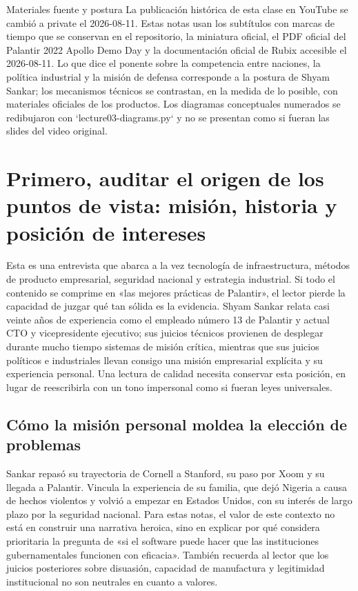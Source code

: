 \documentclass[a4paper]{article}
\begin{document}
\makecscover

\begin{warningbox}{Materiales fuente y postura}
La publicación histórica de esta clase en YouTube se cambió a private el 2026-08-11. Estas notas usan los subtítulos con marcas de tiempo que se conservan en el repositorio, la miniatura oficial, el PDF oficial del Palantir 2022 Apollo Demo Day y la documentación oficial de Rubix accesible el 2026-08-11. Lo que dice el ponente sobre la competencia entre naciones, la política industrial y la misión de defensa corresponde a la postura de Shyam Sankar; los mecanismos técnicos se contrastan, en la medida de lo posible, con materiales oficiales de los productos. Los diagramas conceptuales numerados se redibujaron con `lecture03-diagrams.py` y no se presentan como si fueran las slides del video original.
\end{warningbox}

\section{Primero, auditar el origen de los puntos de vista: misión, historia y posición de intereses}

Esta es una entrevista que abarca a la vez tecnología de infraestructura, métodos de producto empresarial, seguridad nacional y estrategia industrial. Si todo el contenido se comprime en «las mejores prácticas de Palantir», el lector pierde la capacidad de juzgar qué tan sólida es la evidencia. Shyam Sankar relata casi veinte años de experiencia como el empleado número 13 de Palantir y actual CTO y vicepresidente ejecutivo; sus juicios técnicos provienen de desplegar durante mucho tiempo sistemas de misión crítica, mientras que sus juicios políticos e industriales llevan consigo una misión empresarial explícita y su experiencia personal. Una lectura de calidad necesita conservar esta posición, en lugar de reescribirla con un tono impersonal como si fueran leyes universales.

\subsection{Cómo la misión personal moldea la elección de problemas}

Sankar repasó su trayectoria de Cornell a Stanford, su paso por Xoom y su llegada a Palantir. Vincula la experiencia de su familia, que dejó Nigeria a causa de hechos violentos y volvió a empezar en Estados Unidos, con su interés de largo plazo por la seguridad nacional. Para estas notas, el valor de este contexto no está en construir una narrativa heroica, sino en explicar por qué considera prioritaria la pregunta de «si el software puede hacer que las instituciones gubernamentales funcionen con eficacia». También recuerda al lector que los juicios posteriores sobre disuasión, capacidad de manufactura y legitimidad institucional no son neutrales en cuanto a valores.
\end{document}
